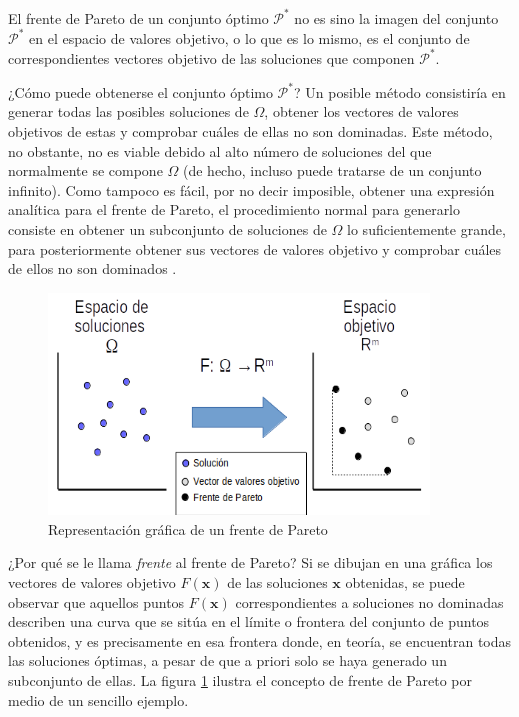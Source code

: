 El frente de Pareto de un conjunto óptimo $\mathcal{P}^*$ no es sino la imagen del conjunto $\mathcal{P}^*$ en el espacio de valores objetivo, o lo que es lo mismo, es el conjunto de correspondientes vectores objetivo de las soluciones que componen $\mathcal{P}^*$.

¿Cómo puede obtenerse el conjunto óptimo $\mathcal{P}^*$? Un posible método consistiría en generar todas las posibles soluciones de $\Omega$, obtener los vectores de valores objetivos de estas y comprobar cuáles de ellas no son dominadas. Este método, no obstante, no es viable debido al alto número de soluciones del que normalmente se compone $\Omega$ (de hecho, incluso puede tratarse de un conjunto infinito). Como tampoco es fácil, por no decir imposible, obtener una expresión analítica para el frente de Pareto, el procedimiento normal para generarlo consiste en obtener un subconjunto de soluciones de $\Omega$ lo suficientemente grande, para posteriormente obtener sus vectores de valores objetivo y comprobar cuáles de ellos no son dominados \cite{coello2007evolutionary}.

\begin{figure}
	\centering
	\includegraphics[width=0.9\textwidth]{Images/pareto}
	\caption{Representación gráfica de un frente de Pareto}
	\label{fig:pareto}
\end{figure}

¿Por qué se le llama \emph{frente} al frente de Pareto? Si se dibujan en una gráfica los vectores de valores objetivo $F(\textbf{x})$ de las soluciones $\textbf{x}$ obtenidas, se puede observar que aquellos puntos $F(\textbf{x})$ correspondientes a soluciones no dominadas describen una curva que se sitúa en el límite o frontera del conjunto de puntos obtenidos, y es precisamente en esa frontera donde, en teoría, se encuentran todas las soluciones óptimas, a pesar de que a priori solo se haya generado un subconjunto de ellas. La figura \ref{fig:pareto} ilustra el concepto de frente de Pareto por medio de un sencillo ejemplo.




